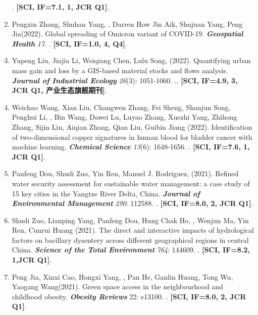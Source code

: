 \begin{enumerate}
    . 
    \textbf{[SCI, IF=7.1, 1, JCR Q1]}.
\item
    Pengxin Zhang\CF, Shuhan Yang\CF, \Shaoqing, Darren How Jin Aik, Shujuan Yang, Peng Jia\CS (2022).
    Global spreading of Omicron variant of COVID-19.
    \textbf{\textit{Geospatial Health}} \textit{17}.
    . 
    \textbf{[SCI, IF=1.0, 4, Q4]}.
\item
    Yupeng Liu\CF, Jiajia Li\CF, Weiqiang Chen\CS, Lulu Song, \Shaoqing \enspace (2022).
    Quantifying urban mass gain and loss by a GIS‐based material stocks and flows analysis.
    \textbf{\textit{Journal of Industrial Ecology}} \textit{26}(3): 1051-1060.
    .. 
    \textbf{[SCI, IF=4.9, 3, JCR Q1, 产业生态旗舰期刊]}.
\item
    Weichao Wang\CF, Xian Liu\CF, Changwen Zhang, Fei Sheng, Shanjun Song, Penghui Li, \Shaoqing, Bin Wang, Dawei Lu, Luyao Zhang, Xuezhi Yang, Zhihong Zhang, Sijin Liu, Aiqian Zhang, Qian Liu\CS, Guibin Jiang (2022).
    Identification of two-dimensional copper signatures in human blood for bladder cancer with machine learning.
    \textbf{\textit{Chemical Science}} \textit{13}(6): 1648-1656.
    .  
    \textbf{[SCI, IF=7.6, 1, JCR Q1]}.
\item
    Panfeng Dou, Shudi Zuo\CS, Yin Ren\CS, Manuel J. Rodriguez, \Shaoqing \enspace (2021).
    Refined water security assessment for sustainable water management: a case study of 15 key cities in the Yangtze River Delta, China.
    \textbf{\textit{Journal of Environmental Management}} \textit{290}: 112588.
    . 
    \textbf{[SCI, IF=8.0, 2, JCR Q1]}.
\item
    Shudi Zuo, Lianping Yang\CS, Panfeng Dou, Hung Chak Ho, \Shaoqing, Wenjun Ma, Yin Ren, Cunrui Huang (2021).
    The direct and interactive impacts of hydrological factors on bacillary dysentery across different geographical regions in central China.
    \textbf{\textit{Science of the Total Environment}} \textit{764}: 144609.
    . 
    \textbf{[SCI, IF=8.2, 1,JCR Q1]}.
\item
    Peng Jia\CF, Xinxi Cao\CF, Hongxi Yang, \Shaoqing, Pan He, Ganlin Huang, Tong Wu, Yaogang Wang\CS (2021).
    Green space access in the neighbourhood and childhood obesity.
    \textbf{\textit{Obesity Reviews}} 22: e13100.
    .
    \textbf{[SCI, IF=8.0, 2, JCR Q1]}.

\end{enumerate}
